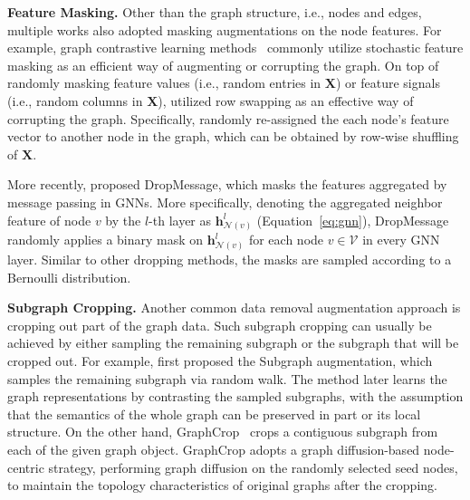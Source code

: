 \documentclass[11pt]{article}
\renewcommand\paragraph[1]{\vspace{0.05in} \noindent \textbf{#1.}}
\begin{document}
\paragraph{Feature Masking} Other than the graph structure, i.e., nodes and edges, multiple works also adopted masking augmentations on the node features. For example, graph contrastive learning methods~\cite{thakoor2022largescale,you2020graph,you2021graph,zhu2020deep} commonly utilize stochastic feature masking as an efficient way of augmenting or corrupting the graph. On top of randomly masking feature values (i.e., random entries in $\mathbf{X}$) or feature signals (i.e., random columns in $\mathbf{X}$), \citet{velickovic2019deep} utilized row swapping as an effective way of corrupting the graph. Specifically, \citet{velickovic2019deep} randomly re-assigned the each node's feature vector to another node in the graph, which can be obtained by row-wise shuffling of $\mathbf{X}$.

More recently, \citet{fang2022dropmessage} proposed DropMessage, which masks the features aggregated by message passing in GNNs. More specifically, denoting the aggregated neighbor feature of node $v$ by the $l$-th layer as $\boldsymbol{h}_{\mathcal{N}(v)}^l$ (Equation~\eqref{eq:gnn}), DropMessage randomly applies a binary mask on $\boldsymbol{h}_{\mathcal{N}(v)}^l$ for each node $v \in \mathcal{V}$ in every GNN layer. Similar to other dropping methods, the masks are sampled according to a Bernoulli distribution.

\paragraph{Subgraph Cropping} Another common data removal augmentation approach is cropping out part of the graph data. Such subgraph cropping can usually be achieved by either sampling the remaining subgraph or the subgraph that will be cropped out. For example, \citet{you2020graph} first proposed the Subgraph augmentation, which samples the remaining subgraph via random walk. The method later learns the graph representations by contrasting the sampled subgraphs, with the assumption that the semantics of the whole graph can be preserved in part or its local structure. On the other hand, GraphCrop~\cite{wang2020graphcrop} crops a contiguous subgraph from each of the given graph object. GraphCrop adopts a graph diffusion-based node-centric strategy, performing graph diffusion on the randomly selected seed nodes, to maintain the topology characteristics of original graphs after the cropping.
\end{document}
